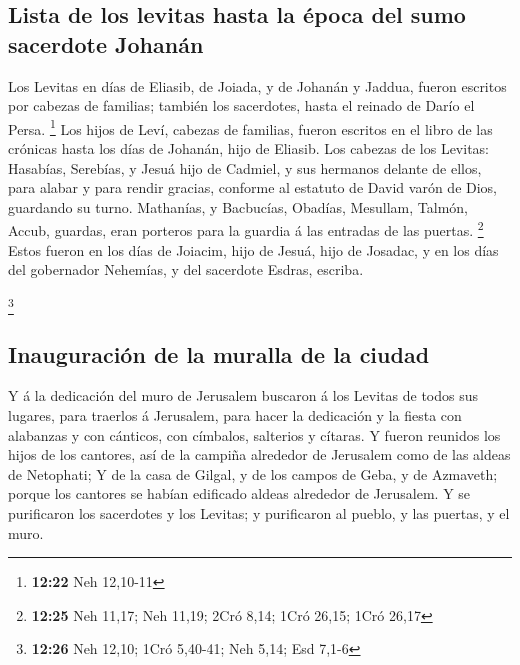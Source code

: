 \hypertarget{lista-de-los-levitas-hasta-la-uxe9poca-del-sumo-sacerdote-johanuxe1n}{%
\subsection{Lista de los levitas hasta la época del sumo sacerdote
Johanán}\label{lista-de-los-levitas-hasta-la-uxe9poca-del-sumo-sacerdote-johanuxe1n}}

 Los Levitas en días de Eliasib, de Joiada, y de Johanán
y Jaddua, fueron escritos por cabezas de familias; también los
sacerdotes, hasta el reinado de Darío el Persa. \footnote{\textbf{12:22}
  Neh 12,10-11}  Los hijos de Leví, cabezas de familias,
fueron escritos en el libro de las crónicas hasta los días de Johanán,
hijo de Eliasib.  Los cabezas de los Levitas: Hasabías,
Serebías, y Jesuá hijo de Cadmiel, y sus hermanos delante de ellos, para
alabar y para rendir gracias, conforme al estatuto de David varón de
Dios, guardando su turno.  Mathanías, y Bacbucías,
Obadías, Mesullam, Talmón, Accub, guardas, eran porteros para la guardia
á las entradas de las puertas. \footnote{\textbf{12:25} Neh 11,17; Neh
  11,19; 2Cró 8,14; 1Cró 26,15; 1Cró 26,17}  Estos fueron
en los días de Joiacim, hijo de Jesuá, hijo de Josadac, y en los días
del gobernador Nehemías, y del sacerdote Esdras, escriba.

\footnote{\textbf{12:26} Neh 12,10; 1Cró 5,40-41; Neh 5,14; Esd 7,1-6}

\hypertarget{inauguraciuxf3n-de-la-muralla-de-la-ciudad}{%
\subsection{Inauguración de la muralla de la
ciudad}\label{inauguraciuxf3n-de-la-muralla-de-la-ciudad}}

 Y á la dedicación del muro de Jerusalem buscaron á los
Levitas de todos sus lugares, para traerlos á Jerusalem, para hacer la
dedicación y la fiesta con alabanzas y con cánticos, con címbalos,
salterios y cítaras.  Y fueron reunidos los hijos de los
cantores, así de la campiña alrededor de Jerusalem como de las aldeas de
Netophati;  Y de la casa de Gilgal, y de los campos de
Geba, y de Azmaveth; porque los cantores se habían edificado aldeas
alrededor de Jerusalem.  Y se purificaron los sacerdotes
y los Levitas; y purificaron al pueblo, y las puertas, y el muro.

